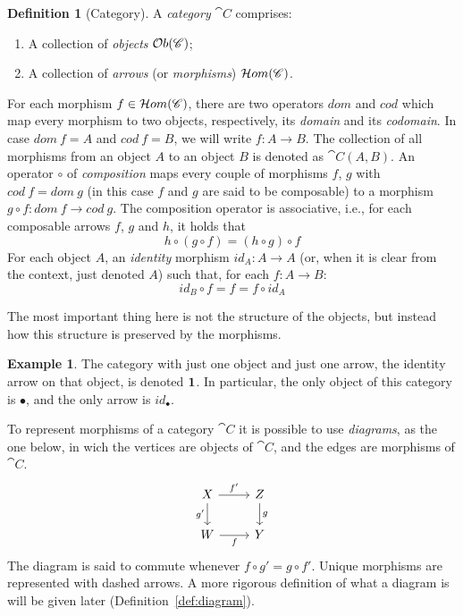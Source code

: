 \documentclass[a4paper, twoside,openright]{report}
\theoremstyle{plain}
\theoremstyle{definition}
\newtheorem{definition}[theorem]{Definition}
\newtheorem{example}[theorem]{Example}
\begin{document}
\begin{definition}[Category]\label{def:category}
    A \emph{category} $\cat{C}$ comprises:
    \begin{enumerate}
        \item A collection of \emph{objects} $\mathcal{O}b(\mathscr{C})$;
        \item A collection of \emph{arrows} (or \emph{morphisms}) $\mathcal{H}om(\mathscr{C})$.
    \end{enumerate}
    For each morphism $f \in \mathcal{H}om(\mathscr{C})$, there are two operators $dom$ and $cod$ which map every morphism to two objects, respectively, its \emph{domain} and its \emph{codomain}. In case $dom\ f = A$ and $cod\ f = B$, we will write $f: A \rightarrow B$. The collection of all morphisms from an object $A$ to an object $B$ is denoted as $\cat{C}(A, B)$.
    An operator $\circ$ of \emph{composition} maps every couple of morphisms $f$, $g$ with $cod\ f = dom \ g$ (in this case $f$ and $g$ are said to be composable) to a morphism $g \circ f : dom\ f \rightarrow cod \ g$. The composition operator is associative, i.e., for each composable arrows $f$, $g$ and $h$, it holds that
    $$
        h \circ (g \circ f) = (h\circ g) \circ f
    $$
    For each object $A$, an \emph{identity} morphism $id_A : A \rightarrow A$ (or, when it is clear from the context, just denoted $A$)  such that, for each $f: A \rightarrow B$:
    \[
        id_B \circ f = f = f \circ id_A 
    \]
\end{definition}

The most important thing here is not the structure of the objects, but instead how this structure is preserved by the morphisms.

\begin{example}\label{ex:1_cat}
    The category with just one object and just one arrow, the identity arrow on that object, is denoted $\textbf 1$. In particular, the only object of this category is $\bullet$, and the only arrow is $id_{\bullet}$.
\end{example}

To represent morphisms of a category $\cat{C}$ it is possible to use \emph{diagrams}, as the one below, in wich the vertices are objects of $\cat{C}$, and the edges are morphisms of $\cat{C}$.
    \[
    \begin{tikzcd}
        X \arrow[d, "g'" swap] \arrow[r, "f'"] & Z \arrow[d, "g"] \\
        W \arrow[r, "f" swap] & Y        
    \end{tikzcd}
    \]
The diagram is said to commute whenever  $f \circ g' = g \circ f'$. Unique morphisms are represented with dashed arrows.
A more rigorous definition of what a diagram is will be given later (Definition~\ref{def:diagram}).
\end{document}
